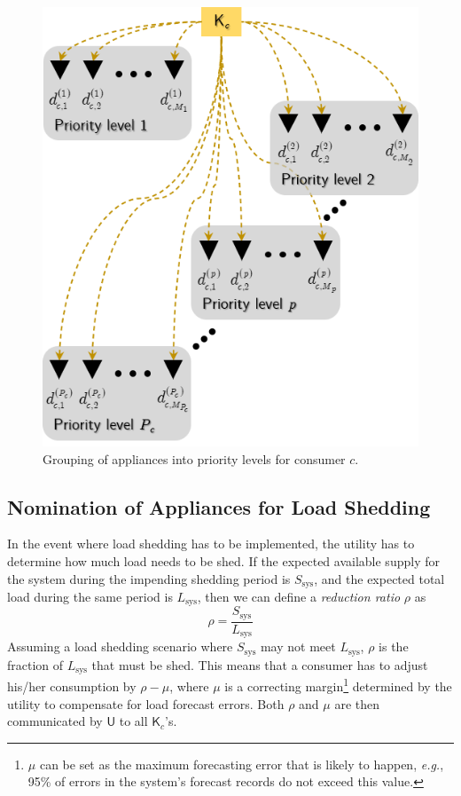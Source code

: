 \documentclass[journal, a4paper]{IEEEtran}
\begin{document}
\begin{figure}[t!]
	\centering
	\includegraphics[scale=0.75]{consumer appliance prioritization.png}
	\caption{Grouping of appliances into priority levels for consumer $c$.}
	\label{fig: Appliance priority levels}
\end{figure}

\subsection{Nomination of Appliances for Load Shedding}
\label{subsec: I. Nomination of Appliances for Load Shedding}

In the event where load shedding has to be implemented, the utility has to determine how much load needs to be shed.
If the expected available supply for the system during the impending shedding period is $S_{\text{sys}}$,
and the expected total load during the same period is $L_{\text{sys}}$,
then we can define a \textit{reduction ratio} $\rho$ as
\begin{equation}
	\label{eqn: Reduction ratio}
	\rho = \frac{S_{\text{sys}}}{L_{\text{sys}}}
\end{equation}
Assuming a load shedding scenario where $S_{\text{sys}}$ may not meet $L_{\text{sys}}$,
$\rho$ is the fraction of $L_{\text{sys}}$ that must be shed.
This means that a consumer has to adjust his/her consumption by $\rho - \mu$,
where $\mu$ is a correcting margin\footnote{
$\mu$ can be set as the maximum forecasting error that is likely to happen,
\textit{e.g.}, 95\% of errors in the system's forecast records do not exceed this value.}
determined by the utility to compensate for load forecast errors.
Both $\rho$ and $\mu$ are then communicated by $\mathsf{U}$ to all $\mathsf{K}_{c}$'s.
\end{document}
